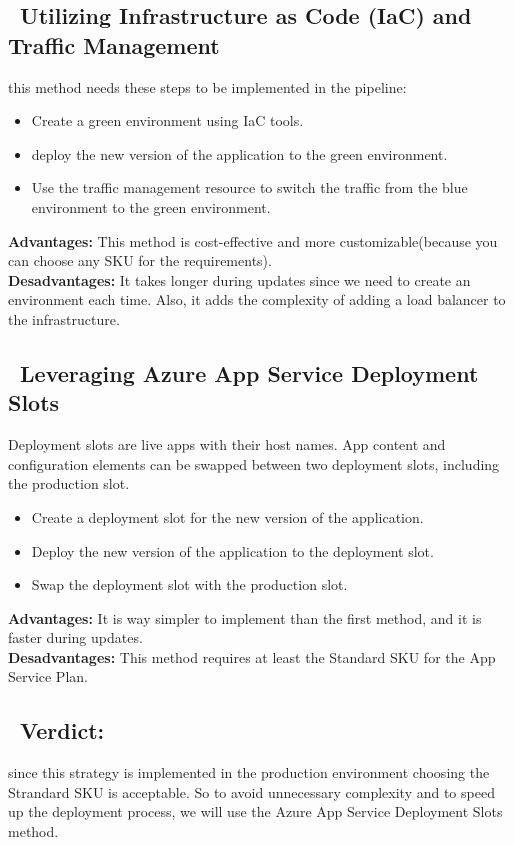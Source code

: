 \subsection*{ \textbullet\ Utilizing Infrastructure as Code (IaC) and Traffic Management}
this method needs these steps to be implemented in the pipeline:
\begin{itemize}
    \item Create a green environment using IaC tools.
    \item deploy the new version of the application to the green environment.
    \item Use the traffic management resource to switch the traffic from the blue environment to the green environment.
\end{itemize}
\textbf{Advantages:} This method is cost-effective and more customizable(because you can choose any SKU for the requirements).
\\
\textbf{Desadvantages:} It takes longer during updates since we need to create an environment each time. Also, it adds the complexity of adding a load balancer to the infrastructure.
\subsection*{ \textbullet\ Leveraging Azure App Service Deployment Slots}
Deployment slots are live apps with their host names. App content and configuration elements can be swapped between two deployment slots, including the production slot.
\begin{itemize}
    \item Create a deployment slot for the new version of the application.
    \item Deploy the new version of the application to the deployment slot.
    \item Swap the deployment slot with the production slot.
\end{itemize}
\textbf{Advantages:} It is way simpler to implement than the first method, and it is faster during updates.
\\
\textbf{Desadvantages:} This method requires at least the Standard SKU for the App Service Plan.
\subsection*{ \textbullet\ Verdict:}
since this strategy is implemented in the production environment choosing the Strandard SKU is acceptable. So to avoid unnecessary complexity and to speed up the deployment process, we will use the Azure App Service Deployment Slots method.
\\

